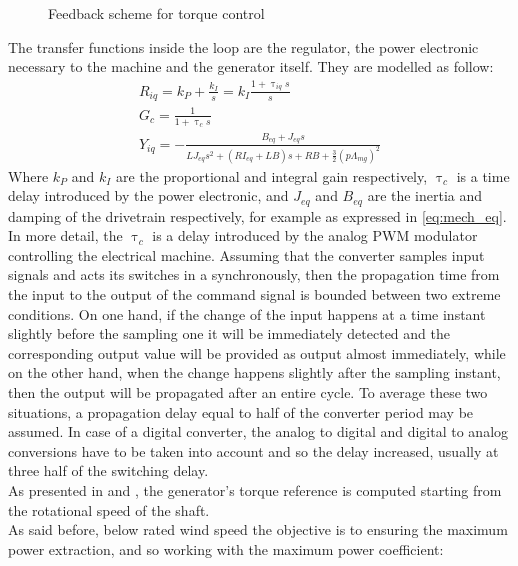 \begin{figure}[htb]
    \centering
    
    \caption{Feedback scheme for torque control}
    \label{fig:d_torque_control}
\end{figure}

The transfer functions inside the loop are the regulator, the power electronic necessary to the machine and the generator itself. They are modelled as follow:
\begin{gather}
    R_{iq}=k_P + \frac{k_I}{s}=k_I\frac{1+\uptau_{iq}s}{s}
    \label{eq:R_iq}\\
    G_c = \frac{1}{1+\uptau_cs}
    \label{eq:G_c}\\
    Y_{iq} = -\frac{B_{eq} + J_{eq}s}{LJ_{eq}s^2+\left(RI_{eq} + L B\right)s + RB + \frac{3}{2}(p\Lambda_{mg})^2}
    \label{eq:Y_iq}
\end{gather}
Where $k_P$ and $k_I$ are the proportional and integral gain respectively, $\uptau_c$ is a time delay introduced by the power electronic, and $J_{eq}$ and $B_{eq}$ are the inertia and damping of the drivetrain respectively, for example as expressed in \autoref{eq:mech_eq}.\\
In more detail, the $\uptau_c$ is a delay introduced by the analog PWM modulator controlling the electrical machine. Assuming that the converter samples input signals and acts its switches in a synchronously, then the propagation time from the input to the output of the command signal is bounded between two extreme conditions. On one hand, if the change of the input happens at a time instant slightly before the sampling one it will be immediately detected and the corresponding output value will be provided as output almost immediately, while on the other hand, when the change happens slightly after the sampling instant, then the output will be propagated after an entire cycle. To average these two situations, a propagation delay equal to half of the converter period may be assumed. In case of a digital converter, the analog to digital and digital to analog conversions have to be taken into account and so the delay increased, usually at three half of the switching delay.\\
As presented in \cite{Aerodynamics_of_wind_turbines} and \cite{SMILDEN2016386}, the generator's torque reference is computed starting from the rotational speed of the shaft. \\
As said before, below rated wind speed the objective is to ensuring the maximum power extraction, and so working with the maximum power coefficient:
